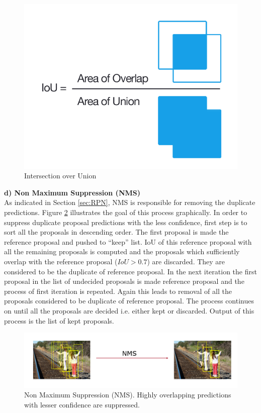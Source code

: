 \begin{figure}
    \centering
    \includegraphics[width=0.5\linewidth]{images/iou.PNG}
    \caption{Intersection over Union}
    \label{fig:iou}
\end{figure}


\textbf{d) Non Maximum Suppression (NMS)} \\
As indicated in Section \ref{sec:RPN}, NMS is responsible for removing the duplicate predictions. Figure \ref{fig:nms} illustrates the goal of this process graphically. In order to suppress duplicate proposal predictions with the less confidence, first step is to sort all the proposals in descending order. The first proposal is made  the reference proposal and pushed to ``keep'' list. IoU of this reference proposal with all the remaining proposals is computed and the proposals which sufficiently overlap with the reference proposal ($IoU > 0.7$) are discarded. They are considered to be the duplicate of reference proposal. In the next iteration the first proposal in the list of undecided proposals is made reference proposal and the process of first iteration is repeated. Again this leads to removal of all the proposals considered to be duplicate of reference proposal. The process continues on until all the proposals are decided i.e. either kept or discarded. Output of this process is the list of kept proposals. 


\begin{figure}
    \centering
    \includegraphics[width=\linewidth]{images/nms.PNG}
    \caption[Non Maximum Suppression (NMS)]{Non Maximum Suppression (NMS). Highly overlapping predictions with lesser confidence are suppressed.}
    \label{fig:nms}
\end{figure}

